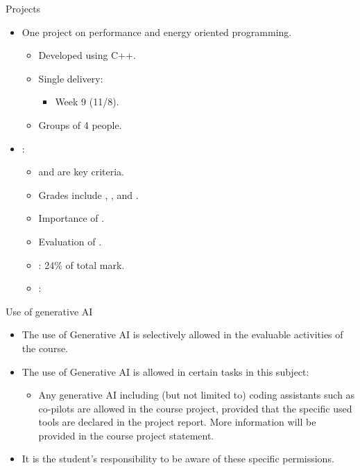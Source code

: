 \begin{frame}[t]{Projects}
\begin{itemize}
  \item One project on performance and energy oriented programming.
    \begin{itemize}
        \item Developed using C++.
        \item Single delivery:
        \begin{itemize}
          \item Week 9 (11/8).
        \end{itemize}
        \item Groups of 4 people.
    \end{itemize}

    \item {}:
      \begin{itemize}
        \item {} and  are key criteria.
        \item Grades include , , 
              and .
        \item Importance of .
        \item Evaluation of .
        \item {}: 24\% of total mark.
        \item {}: 
    \end{itemize}
\end{itemize}
\end{frame}

\begin{frame}[t]{Use of generative AI}
\begin{itemize}

\item The use of Generative AI is selectively allowed in the evaluable activities of the course.

\item The use of Generative AI is allowed in certain tasks in this subject:

  \begin{itemize}
    \item Any generative AI including (but not limited to) coding assistants such as co-pilots are allowed in the course project, provided that the specific used tools are declared in the project report. More information will be provided in the course project statement.
  \end{itemize}

\item It is the student's responsibility to be aware of these specific permissions.
\end{itemize}
\end{frame}

